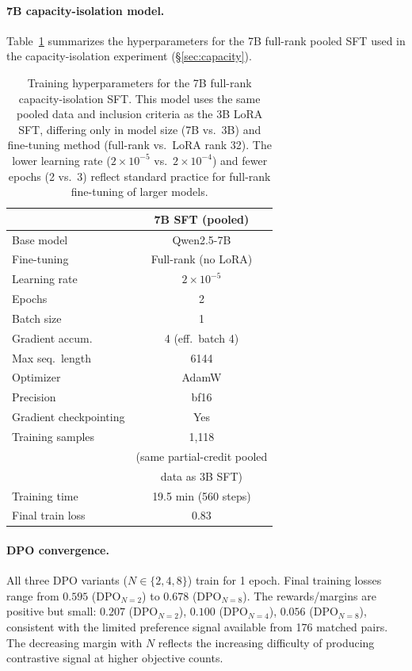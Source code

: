 \paragraph{7B capacity-isolation model.}
Table~\ref{tab:7b_hyperparams} summarizes the hyperparameters for the 7B full-rank pooled SFT used in the capacity-isolation experiment (\S\ref{sec:capacity}).

\begin{table}[h]
\centering
\small
\begin{tabular}{lc}
\toprule
& 7B SFT (pooled) \\
\midrule
Base model & Qwen2.5-7B \\
Fine-tuning & Full-rank (no LoRA) \\
Learning rate & $2 \times 10^{-5}$ \\
Epochs & 2 \\
Batch size & 1 \\
Gradient accum. & 4 (eff.\ batch 4) \\
Max seq.\ length & 6144 \\
Optimizer & AdamW \\
Precision & bf16 \\
Gradient checkpointing & Yes \\
\midrule
Training samples & 1{,}118 \\
 & (same partial-credit pooled \\
 & data as 3B SFT) \\
Training time & 19.5 min (560 steps) \\
Final train loss & 0.83 \\
\bottomrule
\end{tabular}
\caption{Training hyperparameters for the 7B full-rank capacity-isolation SFT. This model uses the same pooled data and inclusion criteria as the 3B LoRA SFT, differing only in model size (7B vs.\ 3B) and fine-tuning method (full-rank vs.\ LoRA rank 32). The lower learning rate ($2 \times 10^{-5}$ vs.\ $2 \times 10^{-4}$) and fewer epochs (2 vs.\ 3) reflect standard practice for full-rank fine-tuning of larger models.}
\label{tab:7b_hyperparams}
\end{table}

\paragraph{DPO convergence.}
All three DPO variants ($N \in \{2, 4, 8\}$) train for 1 epoch. Final training losses range from $0.595$ (DPO$_{N=2}$) to $0.678$ (DPO$_{N=8}$). The rewards/margins are positive but small: $0.207$ (DPO$_{N=2}$), $0.100$ (DPO$_{N=4}$), $0.056$ (DPO$_{N=8}$), consistent with the limited preference signal available from 176 matched pairs. The decreasing margin with $N$ reflects the increasing difficulty of producing contrastive signal at higher objective counts.

